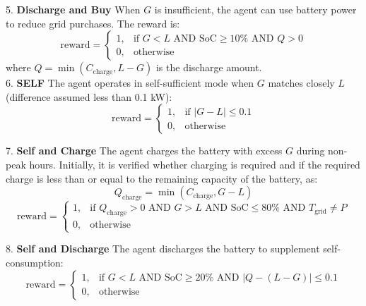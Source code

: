 \documentclass[preprint,12pt]{elsarticle}
\begin{document}
5. \textbf{Discharge and Buy}  
   When $G$ is insufficient, the agent can use battery power to reduce grid purchases. The reward is:
   \[
    \text{reward} = 
    \begin{cases} 
    1, & \text{if } G < L \text{ AND SoC} \geq 10\% \text{ AND } Q > 0 \\
    0, & \text{otherwise}
    \end{cases}
    \]
   where $Q = \min(C_{\text{charge}}, L - G)$ is the discharge amount.\\

6. \textbf{SELF}  
   The agent operates in self-sufficient mode when $G$ matches closely $L$ (difference assumed less than 0.1 kW):
   \[
    \text{reward} = 
    \begin{cases} 
    1, & \text{if } |G - L| \leq 0.1 \\
    0, & \text{otherwise}
    \end{cases}
    \]

7. \textbf{Self and Charge}  
    The agent charges the battery with excess $G$ during non-peak hours. Initially, it is verified whether charging is required and if the required charge is less than or equal to the remaining capacity of the battery, as:
   \[
   Q_{\text{charge}} = \min(C_{\text{charge}}, G - L)
   \]
   \[
    \text{reward} = 
    \begin{cases} 
    1, & \text{if } Q_{\text{charge}} > 0 \text{ AND } G > L \text{ AND SoC} \leq 80\% \text{ AND } T_{\text{grid}} \neq P \\
    0, & \text{otherwise}
    \end{cases}
    \]

8. \textbf{Self and Discharge}  
   The agent discharges the battery to supplement self-consumption:
   \[
    \text{reward} = 
    \begin{cases} 
    1, & \text{if } G < L \text{ AND SoC} \geq 20\% \text{ AND } |Q - (L-G)| \leq 0.1 \\
    0, & \text{otherwise}
    \end{cases}
    \]
\end{document}
